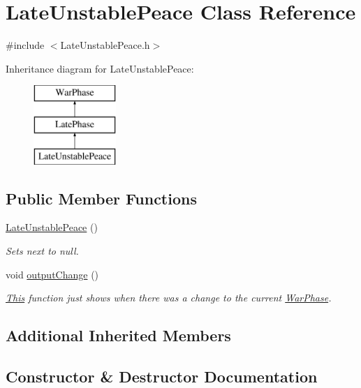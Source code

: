 \hypertarget{class_late_unstable_peace}{}\section{Late\+Unstable\+Peace Class Reference}
\label{class_late_unstable_peace}


{\ttfamily \#include $<$Late\+Unstable\+Peace.\+h$>$}

Inheritance diagram for Late\+Unstable\+Peace\+:\begin{figure}[H]
\begin{center}
\leavevmode
\includegraphics[height=3.000000cm]{class_late_unstable_peace}
\end{center}
\end{figure}
\subsection*{Public Member Functions}
\begin{DoxyCompactItemize}
\item 
\mbox{\hyperlink{class_late_unstable_peace_a2ebf779e50fa36755528d739d3c46914}{Late\+Unstable\+Peace}} ()
\begin{DoxyCompactList}\small\item\em Sets next to null. \end{DoxyCompactList}\item 
void \mbox{\hyperlink{class_late_unstable_peace_a5cd4d50424017c5666386fc95e4bf0ae}{output\+Change}} ()
\begin{DoxyCompactList}\small\item\em \mbox{\hyperlink{class_this}{This}} function just shows when there was a change to the current \mbox{\hyperlink{class_war_phase}{War\+Phase}}. \end{DoxyCompactList}\end{DoxyCompactItemize}
\subsection*{Additional Inherited Members}


\subsection{Constructor \& Destructor Documentation}
\mbox{\label{class_late_unstable_peace_a2ebf779e50fa36755528d739d3c46914}} 
